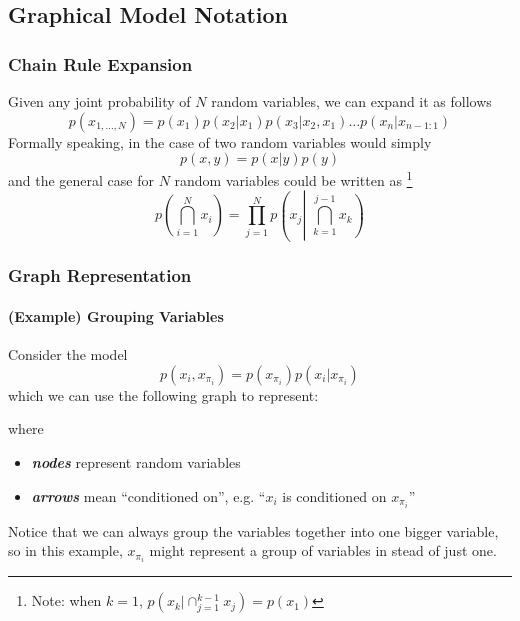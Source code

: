 \documentclass[11pt]{article}
\begin{document}
\subsection{Graphical Model Notation}
\subsubsection{Chain Rule Expansion} Given any joint probability of $N$ random variables, we can expand it as follows
\begin{equation}
    p\left(x_{1, \ldots, N}\right)=p\left(x_{1}\right) p\left(x_{2} | x_{1}\right) p\left(x_{3} | x_{2}, x_{1}\right) \ldots p\left(x_{n} | x_{n-1: 1}\right)
\end{equation}
Formally speaking, in the case of two random variables would simply
\begin{equation}
    p(x, y)=p(x | y) p(y)
\end{equation}
and the general case for $N$ random variables could be written as
\footnote{Note: when $k = 1$, $p\left(x_{k} | \cap_{j=1}^{k-1} x_{j}\right) = p(x_1)$}
\begin{equation}
    p\left(\bigcap_{i=1}^{N} x_{i}\right)
    = \prod_{j=1}^{N} p\left(x_{j} \left\vert\,\, \bigcap_{k=1}^{j-1} x_{k}\right)\right.
\end{equation}

\subsubsection{Graph Representation} 
\paragraph{(Example) Grouping Variables} Consider the model
\begin{equation}
    p\left(x_{i}, x_{\pi_{i}}\right)=p\left(x_{\pi_{i}}\right) p\left(x_{i} | x_{\pi_{i}}\right)
\end{equation}
which we can use the following graph to represent:
\begin{center}
\end{center}
where
\begin{itemize}
    \item \textit{\textbf{nodes}} represent random variables
    \item \textit{\textbf{arrows}} mean ``conditioned on'', e.g. ``$x_i$ is conditioned on $x_{\pi_i}$''
\end{itemize}
Notice that we can always group the variables together into one bigger variable, so in this example, $x_{\pi_i}$ might represent a group of variables in stead of just one. 
\end{document}
